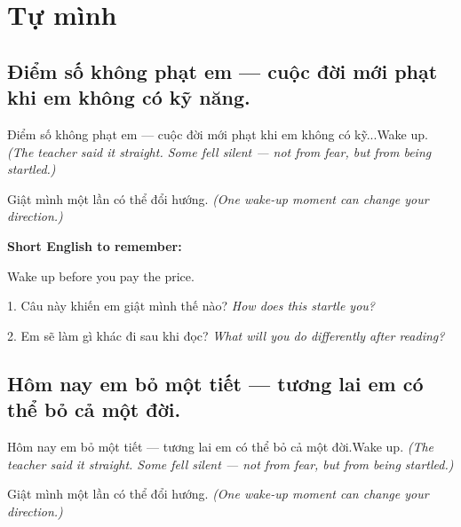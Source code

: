 \chapter{Tự mình}


\section{Điểm số không phạt em — cuộc đời mới phạt khi em không có kỹ năng.}
\begin{truyen}{Điểm số không phạt em — cuộc đời mới phạt khi em không có kỹ...}{Wake up.}
\textit{(The teacher said it straight. Some fell silent — not from fear, but from being startled.)}
\end{truyen}

\begin{baihoc}
Giật mình một lần có thể đổi hướng.
\textit{(One wake-up moment can change your direction.)}
\end{baihoc}

\begin{ghinhoanh}
\textbf{Short English to remember:}

Wake up before you pay the price.

\end{ghinhoanh}

\begin{tuhocnhanh}
1. Câu này khiến em giật mình thế nào? \textit{How does this startle you?}

2. Em sẽ làm gì khác đi sau khi đọc? \textit{What will you do differently after reading?}
\end{tuhocnhanh}
\ngancach


\section{Hôm nay em bỏ một tiết — tương lai em có thể bỏ cả một đời.}
\begin{truyen}{Hôm nay em bỏ một tiết — tương lai em có thể bỏ cả một đời.}{Wake up.}
\textit{(The teacher said it straight. Some fell silent — not from fear, but from being startled.)}
\end{truyen}

\begin{baihoc}
Giật mình một lần có thể đổi hướng.
\textit{(One wake-up moment can change your direction.)}
\end{baihoc}


